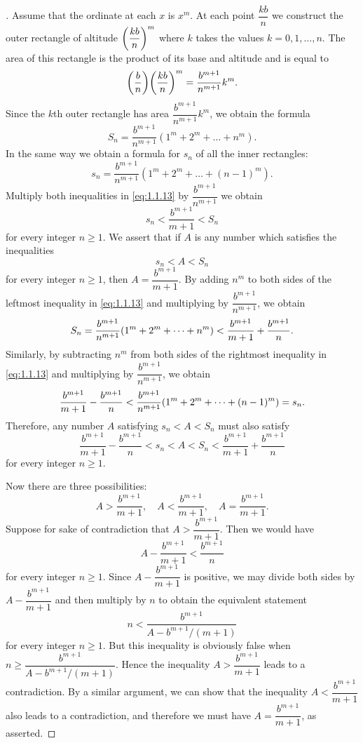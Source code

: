 \begin{proof}[]
  Assume that the ordinate at each \(x\) is \(x^m\).
  At each point \(\dfrac{kb}{n}\) we construct the outer rectangle of altitude \(\left\lparen\dfrac{kb}{n}\right\rparen^m\) where \(k\) takes the values \(k = 0, 1, \dots, n\).
  The area of this rectangle is the product of its base and altitude and is equal to
  \[
    \pa{\dfrac{b}{n}} \pa{\dfrac{kb}{n}}^m = \dfrac{b^{m + 1}}{n^{m + 1}} k^m.
  \]
  Since the \(k\)th outer rectangle has area \(\dfrac{b^{m + 1}}{n^{m + 1}} k^m\), we obtain the formula
  \[
    S_n = \dfrac{b^{m + 1}}{n^{m + 1}} (1^m + 2^m + \dots + n^m).
  \]
  In the same way we obtain a formula for \(s_n\) of all the inner rectangles:
  \[
    s_n = \dfrac{b^{m + 1}}{n^{m + 1}} (1^m + 2^m + \dots + (n - 1)^m).
  \]
  Multiply both inequalities in \cref{eq:1.1.13} by \(\dfrac{b^{m + 1}}{n^{m + 1}}\) we obtain
  \[
    s_n < \dfrac{b^{m + 1}}{m + 1} < S_n
  \]
  for every integer \(n \geq 1\).
  We assert that if \(A\) is any number which satisfies the inequalities
  \[
    s_n < A < S_n
  \]
  for every integer \(n \geq 1\), then \(A = \dfrac{b^{m + 1}}{m + 1}\).
  By adding \(n^m\) to both sides of the leftmost inequality in \cref{eq:1.1.13} and multiplying by \(\dfrac{b^{m + 1}}{n^{m + 1}}\), we obtain
  \[
    S_n = \dfrac{b^{m + 1}}{n^{m + 1}} \pa{1^m + 2^m + \dots + n^m} < \dfrac{b^{m + 1}}{m + 1} + \dfrac{b^{m + 1}}{n}.
  \]
  Similarly, by subtracting \(n^m\) from both sides of the rightmost inequality in \cref{eq:1.1.13} and multiplying by \(\dfrac{b^{m + 1}}{n^{m + 1}}\), we obtain
  \[
    \dfrac{b^{m + 1}}{m + 1} - \dfrac{b^{m + 1}}{n} < \dfrac{b^{m + 1}}{n^{m + 1}} \pa{1^m + 2^m + \dots + (n - 1)^m} = s_n.
  \]
  Therefore, any number \(A\) satisfying \(s_n < A < S_n\) must also satisfy
  \[
    \dfrac{b^{m + 1}}{m + 1} - \dfrac{b^{m + 1}}{n} < s_n < A < S_n < \dfrac{b^{m + 1}}{m + 1} + \dfrac{b^{m + 1}}{n}
  \]
  for every integer \(n \geq 1\).

  Now there are three possibilities:
  \[
    A > \dfrac{b^{m + 1}}{m + 1}, \quad A < \dfrac{b^{m + 1}}{m + 1}, \quad A = \dfrac{b^{m + 1}}{m + 1}.
  \]
  Suppose for sake of contradiction that \(A > \dfrac{b^{m + 1}}{m + 1}\).
  Then we would have
  \[
    A - \dfrac{b^{m + 1}}{m + 1} < \dfrac{b^{m + 1}}{n}
  \]
  for every integer \(n \geq 1\).
  Since \(A - \dfrac{b^{m + 1}}{m + 1}\) is positive, we may divide both sides by \(A - \dfrac{b^{m + 1}}{m + 1}\) and then multiply by \(n\) to obtain the equivalent statement
  \[
    n < \dfrac{b^{m + 1}}{A - b^{m + 1} / (m + 1)}
  \]
  for every integer \(n \geq 1\).
  But this inequality is obviously false when \(n \geq \dfrac{b^{m + 1}}{A - b^{m + 1} / (m + 1)}\).
  Hence the inequality \(A > \dfrac{b^{m + 1}}{m + 1}\) leads to a contradiction.
  By a similar argument, we can show that the inequality \(A < \dfrac{b^{m + 1}}{m + 1}\) also leads to a contradiction, and therefore we must have \(A = \dfrac{b^{m + 1}}{m + 1}\), as asserted.
\end{proof}
